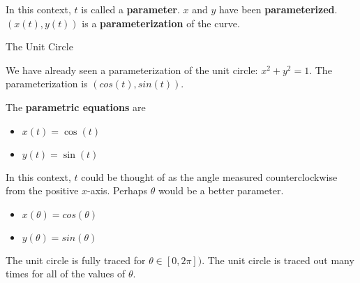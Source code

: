 \documentclass{ximera}
\begin{document}
In this context, $t$ is called a \textbf{parameter}.  $x$ and $y$ have been \textbf{parameterized}.  $(x(t), y(t))$ is a \textbf{parameterization} of the curve.



\begin{example} The Unit Circle


We have already seen a parameterization of the unit circle: $x^2 + y^2 = 1$.  The parameterization is $(cos(t), sin(t))$.

The \textbf{parametric equations} are

\begin{itemize}
\item $x(t) = \cos(t)$
\item $y(t) = \sin(t)$
\end{itemize}




\begin{center}
\end{center}


In this context, $t$ could be thought of as the angle measured counterclockwise from the positive $x$-axis.  Perhaps $\theta$  would be a better parameter.

\begin{itemize}
\item $x(\theta) = cos(\theta)$
\item $y(\theta) = sin(\theta)$
\end{itemize}





The unit circle is fully traced for $\theta \in [0, 2\pi])$.  The unit circle is traced out many times for all of the values of $\theta$.




\end{example}
\end{document}
